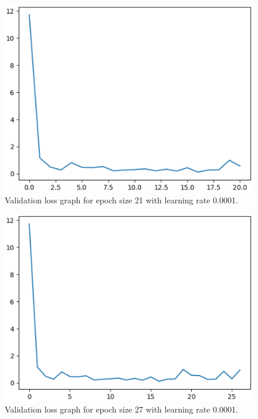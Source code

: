     \begin{figure}
        \includegraphics[width=\textwidth, scale=0.25]{4_30000.eps}
        \caption{Validation loss graph for epoch size 21 with learning rate 0.0001.} \label{Figure2}
    \end{figure}

    \begin{figure}
        \includegraphics[width=\textwidth, scale=0.25]{4_40000.eps}
        \caption{Validation loss graph for epoch size 27 with learning rate 0.0001.} \label{Figure3}
    \end{figure}


